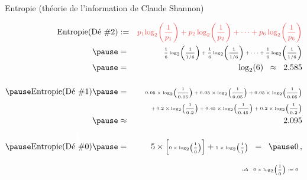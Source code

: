 
\begin{frame}{\huge Entropie ({\scriptsize th\'eorie de l'information de \large Claude Shannon})}
\normalsize

\vskip -0.3cm

\pause
\begin{eqnarray*}
\textnormal{Entropie}(\textnormal{D\'e \#2})
&:=&
	\textnormal{\color{customRed}\small$p_{1}\!\log_{2}\!\left(\frac{1}{p_{1}}\right)
	+ p_{2}\log_{2}\!\left(\frac{1}{p_{2}}\right)
	+ \cdots
	+ p_{6}\log_{2}\!\left(\frac{1}{p_{6}}\right)$}
\\
\pause
& =&
	\textnormal{\tiny$\frac{1}{6}\log_{2}\!\left(\frac{1}{1/6}\right)
	+ \frac{1}{6}\log_{2}\!\left(\frac{1}{1/6}\right)
	+ \cdots
	+ \frac{1}{6}\log_{2}\!\left(\frac{1}{1/6}\right)$}
\\
\pause
& =&
	\log_{2}(6) \;\; \approx \;\; 2.585
\\
\pause
\textnormal{Entropie}(\overset{{\color{white}\textnormal{\huge$1$}}}{\textnormal{D\'e \#1}})
\pause
& =&
	\textnormal{\tiny$0.05\times\log_{2}\!\left(\frac{1}{0.05}\right)
	+ 0.05\times\log_{2}\!\left(\frac{1}{0.05}\right)
	+ 0.05\times\log_{2}\!\left(\frac{1}{0.05}\right)$}
\\
&  &
	\textnormal{\tiny$+\,0.2\times\log_{2}\!\left(\frac{1}{0.2}\right)
	+ 0.45\times\log_{2}\!\left(\frac{1}{0.45}\right)
	+ 0.2\times\log_{2}\!\left(\frac{1}{0.2}\right)$}
\\
\pause
&\approx&
	2.095
\\
\pause
\textnormal{Entropie}(\overset{{\color{white}\textnormal{\Huge$1$}}}{\textnormal{D\'e \#0}})
\pause
& =&
	5\times\left[\textnormal{\tiny$0\times\log_{2}\!\left(\frac{1}{0}\right)$}\right]
	+ \textnormal{\tiny$1\times\log_{2}\!\left(\frac{1}{1}\right)$}
	\;\; = \;\; \pause 0\,,
\\
&&
	{\color{white},\times}\textnormal{\tiny o\`u\;\; $0 \times \log_{2}\!\left(\dfrac{1}{0}\right) := 0$}
	{\color{white}\overset{1}{1}}
\end{eqnarray*}

\normalsize
\end{frame}


